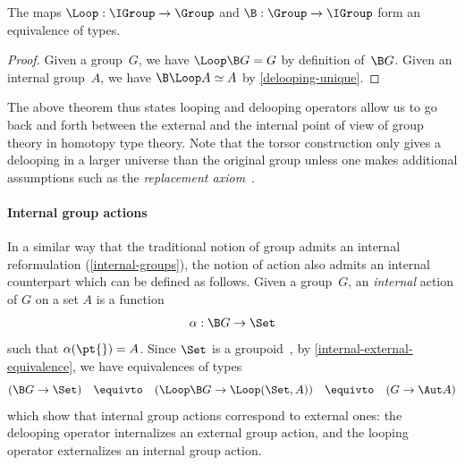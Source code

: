 
\begin{theorem}
  \label{internal-external-equivalence}
  The maps $\Loop:\IGroup\to\Group$ and $\B:\Group\to\IGroup$ form an
  equivalence of types.
\end{theorem}
\begin{proof}
  Given a group~$G$, we have $\Loop\B G=G$ by definition of~$\B G$. Given an
  internal group~$A$, we have $\B\Loop A\simeq A$ by \cref{delooping-unique}.
\end{proof}

\noindent
The above theorem thus states looping and delooping operators allow us to go
back and forth between the external and the internal point of view of group
theory in homotopy type theory. Note that the torsor construction only gives a
delooping in a larger universe than the original group unless one makes
additional assumptions such as the \emph{replacement
  axiom}~\cite[Axiom~18.1.8]{rijke2022introduction}.


\paragraph{Internal group actions}
In a similar way that the traditional notion of group admits an internal
reformulation (\cref{internal-groups}), the notion of action also admits an
internal counterpart which can be defined as follows.
%
Given a group~$G$, an \emph{internal} action of $G$ on a set $A$ is a function
\[
  \alpha : \B G \to \Set
\]
such that $\alpha(\pt{})=A$. Since $\Set$ is a
groupoid~\cite[Theorem 7.1.11]{hottbook}, by
\cref{internal-external-equivalence}, we have equivalences of types
\[
  (\B G\to\Set)
  \quad\equivto\quad
  (\Loop\B G\to\Loop(\Set,A))
  \quad\equivto\quad
  (G\to\Aut A)
\]
which show that internal group actions correspond to external ones: the
delooping operator internalizes an external group action, and the looping
operator externalizes an internal group action.


